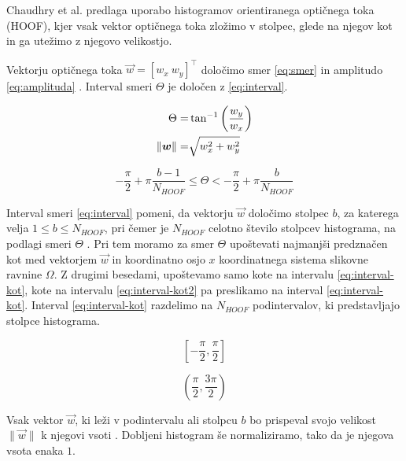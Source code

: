 Chaudhry et al. \cite{chaudhry2009histograms} predlaga uporabo histogramov orientiranega optičnega toka (HOOF), kjer vsak vektor optičnega toka zložimo v stolpec, glede na njegov kot in ga utežimo z njegovo velikostjo.

Vektorju optičnega toka $\vec{w} = [w_x~w_y]^\top$ določimo smer \eqref{eq:smer} in amplitudo \eqref{eq:amplituda} \cite{chaudhry2009histograms}. Interval smeri $\Theta$ je določen z \eqref{eq:interval}. 

\begin{align}
	\Theta = & \tan^{-1}\left( \frac{w_y}{w_x} \right) \label{eq:smer} \\
    \left\lVert {\boldsymbol{w}} \right\rVert = & \sqrt{w_x^2 + w_y^2} \label{eq:amplituda}
\end{align}


\begin{equation}\label{eq:interval}
	-\frac{\pi}{2} + \pi \frac{b - 1}{N_{HOOF}} \leq \Theta < - \frac{\pi}{2} + \pi \frac{b}{N_{HOOF}}
\end{equation}


Interval smeri \eqref{eq:interval} pomeni, da vektorju $\vec{w}$ določimo stolpec $b$, za katerega velja $1 \leq b \leq N_{HOOF}$, pri čemer je $N_{HOOF}$ celotno število stolpcev histograma, na podlagi smeri $\Theta$ \cite{chaudhry2009histograms}. Pri tem moramo za smer $\Theta$ upoštevati najmanjši predznačen kot med vektorjem $\vec{w}$ in koordinatno osjo $x$ koordinatnega sistema slikovne ravnine $\mathit{\Omega}$. Z drugimi besedami, upoštevamo samo kote na intervalu \eqref{eq:interval-kot}, kote na intervalu \eqref{eq:interval-kot2} pa preslikamo na interval \eqref{eq:interval-kot}. Interval \eqref{eq:interval-kot} razdelimo na $N_{HOOF}$ podintervalov, ki predstavljajo stolpce histograma. 

\begin{equation}\label{eq:interval-kot}
	\left[-\frac{\pi}{2}, \frac{\pi}{2}\right]
\end{equation}

\begin{equation}\label{eq:interval-kot2}
	\left(\frac{\pi}{2},\frac{3\pi}{2}\right)
\end{equation}

Vsak vektor $\vec{w}$, ki leži v podintervalu ali stolpcu $b$ bo prispeval svojo velikost $\|\vec{w} \|$ k njegovi vsoti \cite{chaudhry2009histograms}. Dobljeni histogram še normaliziramo, tako da je njegova vsota enaka $1$.





